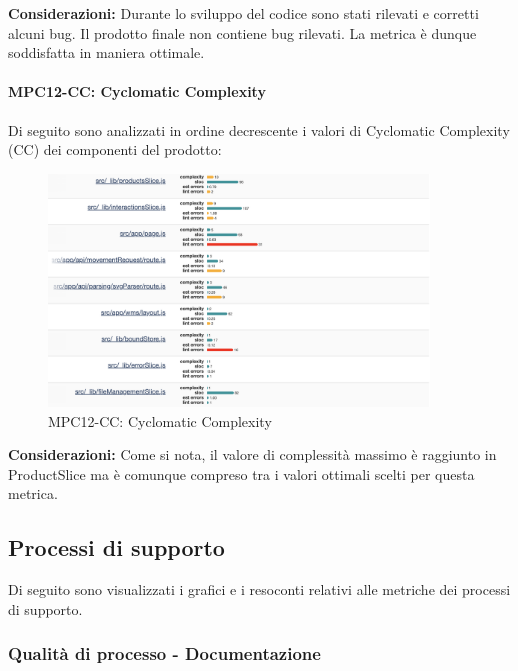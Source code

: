\noindent \textbf{Considerazioni:} Durante lo sviluppo del codice sono stati rilevati e corretti alcuni bug. Il prodotto finale non contiene bug rilevati. La metrica è dunque soddisfatta in maniera ottimale.

\paragraph{MPC12-CC: Cyclomatic Complexity}

Di seguito sono analizzati in ordine decrescente i valori di Cyclomatic Complexity (CC) dei componenti del prodotto:

\begin{figure}[h!] 
    \centering
    \includegraphics[width=0.9\textwidth]{images/MPC12-CC.png}
    \caption{MPC12-CC: Cyclomatic Complexity}
\end{figure}

\noindent \textbf{Considerazioni:} Come si nota, il valore di complessità massimo è raggiunto in ProductSlice ma è comunque compreso tra i valori ottimali scelti per questa metrica.

\newpage

\subsection{Processi di supporto} \label{sec:processi_di_supporto}
Di seguito sono visualizzati i grafici e i resoconti relativi alle metriche dei processi di supporto.
\subsubsection{Qualità di processo - Documentazione}
